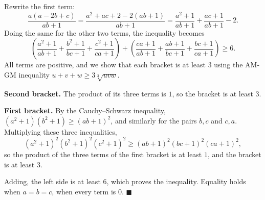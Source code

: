 Rewrite the first term:
\[\dfrac{a(a-2b+c)}{ab+1}=\dfrac{a^2+ac+2-2(ab+1)}{ab+1}=\dfrac{a^2+1}{ab+1}+\dfrac{ac+1}{ab+1}-2.\]
Doing the same for the other two terms, the inequality becomes
\[\left(\dfrac{a^2+1}{ab+1}+\dfrac{b^2+1}{bc+1}+\dfrac{c^2+1}{ca+1}\right)+\left(\dfrac{ca+1}{ab+1}+\dfrac{ab+1}{bc+1}+\dfrac{bc+1}{ca+1}\right)\ge6.\]
All terms are positive, and we show that each bracket is at least $3$ using the AM-GM inequality $u+v+w\ge3\sqrt[3]{uvw}$.

\textbf{Second bracket.} The product of its three terms is $1$, so the bracket is at least $3$.

\textbf{First bracket.} By the Cauchy--Schwarz inequality, $\left(a^2+1\right)\left(b^2+1\right)\ge(ab+1)^2$, and similarly for the pairs $b,c$ and $c,a$. Multiplying these three inequalities,
\[\left(a^2+1\right)^2\left(b^2+1\right)^2\left(c^2+1\right)^2\ge(ab+1)^2(bc+1)^2(ca+1)^2,\]
so the product of the three terms of the first bracket is at least $1$, and the bracket is at least $3$.

Adding, the left side is at least $6$, which proves the inequality. Equality holds when $a=b=c$, when every term is $0$. $\blacksquare$
